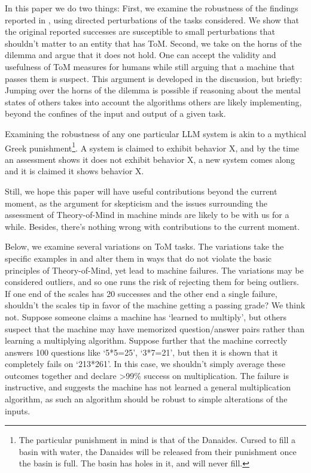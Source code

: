 \documentclass{article}
\begin{document}
In this paper we do two things: First, we examine the robustness of the findings reported in \citep{kosinski2023theory}, using directed perturbations of the tasks considered. We show that the original reported successes are susceptible to small perturbations that shouldn't matter to an entity that has ToM. Second, we take on the horns of the dilemma and argue that it does not hold. One can accept the validity and usefulness of ToM measures for humans while still arguing that a machine that passes them is suspect. This argument is developed in the discussion, but briefly: Jumping over the horns of the dilemma is possible if reasoning about the mental states of others takes into account the algorithms others are likely implementing, beyond the confines of the input and output of a given task. 

Examining the robustness of any one particular LLM system is akin to a mythical Greek punishment\footnote{The particular punishment in mind is that of the Danaides. Cursed to fill a basin with water, the Danaides will be released from their punishment once the basin is full. The basin has holes in it, and will never fill.}. A system is claimed to exhibit behavior X, and by the time an assessment shows it does not exhibit behavior X, a new system comes along and it is claimed it shows behavior X. 

Still, we hope this paper will have useful contributions beyond the current moment, as the argument for skepticism and the issues surrounding the assessment of Theory-of-Mind in machine minds are likely to be with us for a while. Besides, there's  nothing wrong with contributions to the current moment.

Below, we examine several variations on ToM tasks. The variations  take the specific examples in \citep{kosinski2023theory} and alter them in ways that do not violate the basic principles of Theory-of-Mind, yet lead to machine failures. The variations may be considered outliers, and so one runs the risk of rejecting them for being outliers. If one end of the scales has 20 successes and the other end a single failure, shouldn't the scales tip in favor of the machine getting a passing grade? We think not. Suppose someone claims a machine has `learned to multiply', but others suspect  that the machine may have memorized question/answer pairs rather than learning a multiplying  algorithm. Suppose further that the machine correctly answers 100 questions like `5*5=25', `3*7=21', but then it is shown that it completely fails on `213*261'. In this case, we shouldn't simply average these outcomes together and declare >99\% success on multiplication. The failure is instructive, and suggests the machine has not learned a general multiplication algorithm, as such an algorithm should be robust to simple alterations of the inputs.  
\end{document}

